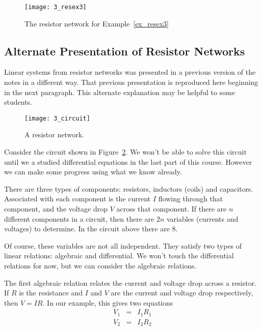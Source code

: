 \begin{figure}
\centerline{\texttt{[image: 3\_resex3]}}
\caption{The resistor network for Example~\ref{ex_resex3}
\label{fig_resex3}}
\end{figure}

\subsection{Alternate Presentation of Resistor Networks}
\label{sub_alternate}

Linear systems from resistor networks was presented in a previous 
version of the notes in a different way. That previous presentation 
is reproduced here beginning in the next paragraph. This alternate 
explanation may be helpful to some students. 

\begin{figure}
\centerline{\texttt{[image: 3\_circuit]}}
\caption{A resistor network. 
\label{fig_circuit}}
\end{figure}

Consider the circuit shown in Figure~\ref{fig_circuit}. 
We won't be able to solve this circuit until we a studied differential equations
in the last part of this course. However we can make some progress
using what we know already.

There are three types of components: 
resistors, inductors (coils) and capacitors.
Associated with each component is the current $I$ flowing through that
component, and the voltage drop $V$ across that component. If there are $n$
different components in a circuit, then there are $2n$ variables (currents and
voltages) to determine. In the circuit above there are $8$.

Of course, these variables are not all independent. They satisfy two types of
linear relations: algebraic and differential. We won't touch the differential
relations for now, but we can consider the algebraic relations.

The first algebraic relation relates the current and voltage drop across a
resistor. If $R$ is the resistance and $I$ and $V$ are the current and voltage
drop respectively, then $V=IR$. In our example, this gives two equations
\begin{eqnarray*}
V_1&=&I_1R_1 \\
V_2&=&I_2R_2 \\
\end{eqnarray*}

